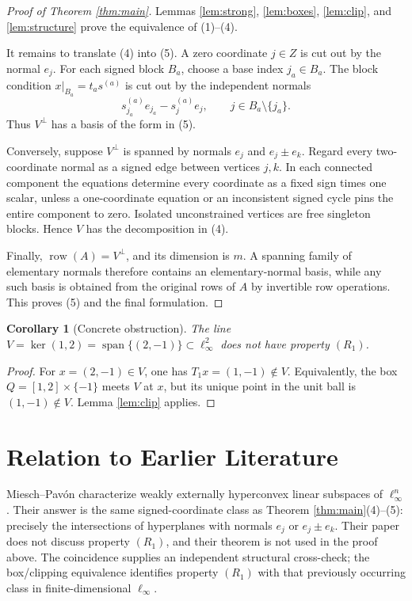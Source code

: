 \documentclass[11pt]{article}
\newtheorem{corollary}{Corollary}
\theoremstyle{definition}
\newcommand{\row}{\operatorname{row}}
\newcommand{\Span}{\operatorname{span}}
\begin{document}
\begin{proof}[Proof of Theorem \ref{thm:main}]
Lemmas \ref{lem:strong}, \ref{lem:boxes}, \ref{lem:clip}, and
\ref{lem:structure} prove the equivalence of (1)--(4).

It remains to translate (4) into (5).  A zero coordinate \(j\in Z\) is cut
out by the normal \(e_j\).  For each signed block \(B_a\), choose a base
index \(j_a\in B_a\).  The block condition
\(x|_{B_a}=t_a s^{(a)}\) is cut out by the independent normals
\[
 s^{(a)}_{j_a}e_{j_a}-s^{(a)}_j e_j,
 \qquad j\in B_a\setminus\{j_a\}.
\]
Thus \(V^\perp\) has a basis of the form in (5).

Conversely, suppose \(V^\perp\) is spanned by normals \(e_j\) and
\(e_j\pm e_k\).  Regard every two-coordinate normal as a signed edge between
vertices \(j,k\).  In each connected component the equations determine every
coordinate as a fixed sign times one scalar, unless a one-coordinate equation
or an inconsistent signed cycle pins the entire component to zero.  Isolated
unconstrained vertices are free singleton blocks.  Hence \(V\) has the
decomposition in (4).

Finally, \(\row(A)=V^\perp\), and its dimension is \(m\).  A spanning family
of elementary normals therefore contains an elementary-normal basis, while
any such basis is obtained from the original rows of \(A\) by invertible row
operations.  This proves (5) and the final formulation.
\end{proof}

\begin{corollary}[Concrete obstruction]
The line \(V=\ker(1,2)=\Span\{(2,-1)\}\subset\ell_\infty^2\) does not have
property \((R_1)\).
\end{corollary}

\begin{proof}
For \(x=(2,-1)\in V\), one has \(T_1x=(1,-1)\notin V\).  Equivalently, the
box \(Q=[1,2]\times\{-1\}\) meets \(V\) at \(x\), but its unique point in
the unit ball is \((1,-1)\notin V\).  Lemma \ref{lem:clip} applies.
\end{proof}

\section{Relation to Earlier Literature}

Miesch--Pav\'on \cite[Theorem 4.7]{MieschPavon} characterize weakly
externally hyperconvex linear subspaces of \(\ell_\infty^n\).  Their answer is
the same signed-coordinate class as Theorem \ref{thm:main}(4)--(5): precisely
the intersections of hyperplanes with normals \(e_j\) or \(e_j\pm e_k\).
Their paper does not discuss property \((R_1)\), and their theorem is not used
in the proof above.  The coincidence supplies an independent structural
cross-check; the box/clipping equivalence identifies property \((R_1)\) with
that previously occurring class in finite-dimensional \(\ell_\infty\).
\end{document}
